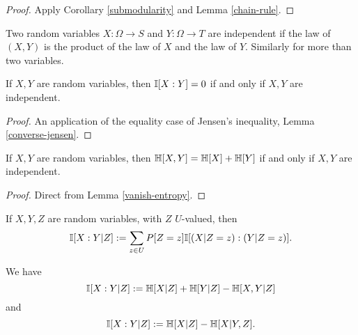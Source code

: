 \begin{proof}   \leanok Apply Corollary \ref{submodularity} and Lemma \ref{chain-rule}.
\end{proof}

\begin{definition}
  \label{independent-def}
  \leanok
  Two random variables $X: \Omega \to S$ and $Y: \Omega \to T$ are independent if the law of $(X,Y)$ is the product of the law of $X$ and the law of $Y$.  Similarly for more than two variables.
\end{definition}

\begin{lemma}
  \label{vanish-entropy}
  \leanok
  If $X,Y$ are random variables, then $\mathbb{I}[X:Y] = 0$ if and only if $X,Y$ are independent.
  \end{lemma}

  \begin{proof} \leanok
    An application of the equality case of Jensen's inequality, Lemma \ref{converse-jensen}.
  \end{proof}

\begin{corollary}\label{add-entropy}
  \leanok
  If $X,Y$ are random variables, then $\mathbb{H}[X,Y] = \mathbb{H}[X] + \mathbb{H}[Y]$ if and only if $X,Y$ are independent.
\end{corollary}

\begin{proof} \leanok
  Direct from Lemma \ref{vanish-entropy}.
\end{proof}

\begin{definition}
\label{conditional-mutual-def}
\leanok
If $X,Y,Z$ are random variables, with $Z$ $U$-valued, then
$$ \mathbb{I}[X:Y|Z] := \sum_{z \in U} P[Z=z] \mathbb{I}[(X|Z=z): (Y|Z=z)].$$
\end{definition}

\begin{lemma}
  \label{conditional-mutual-alt}
  \leanok
We have
  $$ \mathbb{I}[X:Y|Z] := \mathbb{H}[X|Z] + \mathbb{H}[Y|Z] - \mathbb{H}[X,Y|Z]$$
and
  $$ \mathbb{I}[X:Y|Z] := \mathbb{H}[X|Z] - \mathbb{H}[X|Y,Z].$$
\end{lemma}

